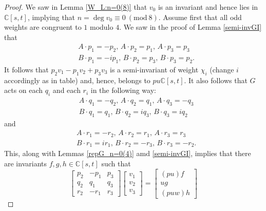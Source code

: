\documentclass[a4paper,reqno]{amsart}
\theoremstyle{definition}
\theoremstyle{remark} \newtheorem{remark}[theorem]{Remark}
\numberwithin{equation}{section}
\begin{document}
\begin{proof}
    We saw in Lemma \ref{W_L:n=0(8)} that \(v_0\) is an invariant and hence lies in \(\mathbb{C}[s,t]\), implying that \(n = \deg v_0 \equiv 0 \ (\textrm{mod}\ 8)\). Assume first that all odd weights are congruent to \(1\) modulo \(4\). We saw in the proof of Lemma \ref{semi-invGI} that 
    \begin{align*}
        &A\cdot p_1 = -p_2,\, A\cdot p_2 = p_1,\, A\cdot p_3 = p_3 \\
        &B\cdot p_1 = -ip_1,\, B\cdot p_2 = p_3,\, B\cdot p_3 = p_2.
    \end{align*}
    It follows that \(p_2v_1 - p_1v_2 + p_3v_3\) is a semi-invariant of weight \(\chi_i\) (change \(i\) accordingly as in table) and, hence, belongs to \(pu\mathbb{C}[s,t]\). It also follows that \(G\) acts on each \(q_i\) and each \(r_i\) in the following way:
    \begin{align*}
        &A\cdot q_1 = -q_2,\, A\cdot q_2 = q_1,\, A\cdot q_3 = -q_3 \\
        &B\cdot q_1 = q_1,\, B\cdot q_2 = iq_3,\, B\cdot q_3 = iq_2 
    \end{align*}
    and
    \begin{align*}
        &A\cdot r_1 = -r_2,\, A\cdot r_2 = r_1,\, A\cdot r_3 = r_3 \\
        &B\cdot r_1 = ir_1,\, B\cdot r_2 = -r_3,\, B\cdot r_3 = -r_2. 
    \end{align*}
    This, along with Lemmas \ref{repG_n=0(4)} amd \ref{semi-invGI}, implies that there are invariants \(f, g, h \in \mathbb{C}[s,t]\) such that 
    \begin{equation*}
        \begin{bmatrix}
            p_2 & -p_1 & p_3 \\
            q_2 & q_1 & q_3 \\
            r_2 & -r_1 & r_3
        \end{bmatrix}
        \begin{bmatrix}
            v_1 \\
            v_2 \\
            v_3
        \end{bmatrix}
        =
        \begin{bmatrix}
            (pu)f \\
            ug \\
            (puw)h
        \end{bmatrix}
    \end{equation*}

\end{proof}
\end{document}
